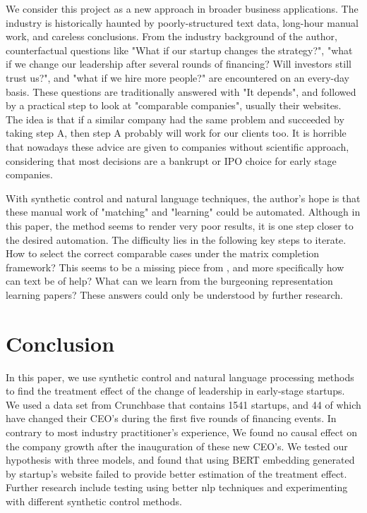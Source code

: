 \documentclass[12pt]{article}
\begin{document}
We consider this project as a new approach in broader business applications. The industry is historically haunted by poorly-structured text data, long-hour manual work, and careless conclusions. From the industry background of the author, counterfactual questions like "What if our startup changes the strategy?", "what if we change our leadership after several rounds of financing? Will investors still trust us?", and "what if we hire more people?" are encountered on an every-day basis. These questions are traditionally answered with "It depends", and followed by a practical step to look at "comparable companies", usually their websites. The idea is that if a similar company had the same problem and succeeded by taking step A, then step A probably will work for our clients too. It is horrible that nowadays these advice are given to companies without scientific approach, considering that most decisions are a bankrupt or IPO choice for early stage companies.

With synthetic control and natural language techniques, the author's hope is that these manual work of "matching" and "learning" could be automated. Although in this paper, the method seems to render very poor results, it is one step closer to the desired automation. The difficulty lies in the following key steps to iterate. How to select the correct comparable cases under the matrix completion framework? This seems to be a missing piece from \cite{athey2021matrix}, and more specifically how can text be of help? What can we learn from the burgeoning representation learning papers? These answers could only be understood by further research.

\section{Conclusion}
In this paper, we use synthetic control and natural language processing methods to find the treatment effect of the change of leadership in early-stage startups. We used a data set from Crunchbase that contains 1541 startups, and 44 of which have changed their CEO's during the first five rounds of financing events. In contrary to most industry practitioner's experience, We found no causal effect on the company growth after the inauguration of these new CEO's. We tested our hypothesis with three models, and found that using BERT embedding generated by startup's website failed to provide better estimation of the treatment effect. Further research include testing using better nlp techniques and experimenting with different synthetic control methods.

\medskip

% 
\printbibliography
\end{document}
